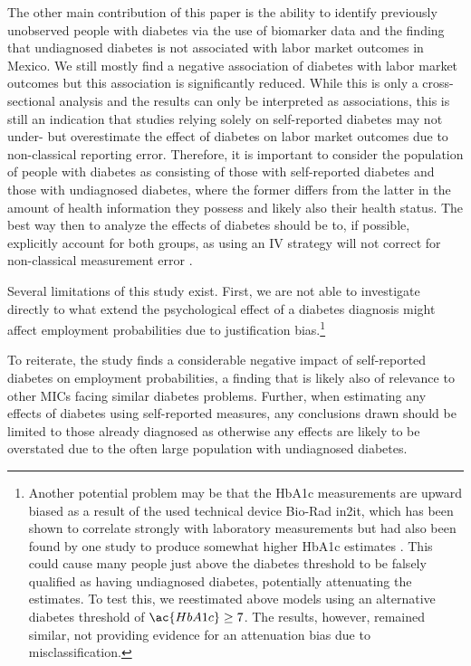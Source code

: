 \documentclass[12pt,english,british]{article}
\begin{document}
The other main contribution of this paper is the ability to identify previously unobserved people with diabetes via the use of biomarker data and the finding that undiagnosed
diabetes is not associated with labor market outcomes in Mexico. We still mostly find a negative association of diabetes with labor market outcomes but this association is significantly reduced. While this is only a cross-sectional analysis and the results can only be interpreted as associations, this is still an indication that studies relying solely on self-reported diabetes may not under- but overestimate the effect of diabetes on labor market outcomes due to non-classical reporting error. Therefore, it is important to consider the population of people with diabetes as consisting of those with self-reported diabetes and those with undiagnosed diabetes, where the former differs from the latter in the amount of health information they possess and likely also their health status. The best way then to analyze the effects of diabetes should be to, if possible, explicitly account for both groups, as using an \ac{IV} strategy will not correct for non-classical measurement error \citep{Cawley2015}.

Several limitations of this study exist. First, we are not able to investigate directly to what extend the psychological effect of a diabetes diagnosis might affect employment probabilities due to justification bias.\footnote{Another potential problem may be that the \ac{HbA1c} measurements are upward biased as a result of the used technical device Bio-Rad in2it, which has been shown to correlate strongly with laboratory measurements \citep{HealthQualityOntario2014} but had also been found by one study to produce somewhat higher \ac{HbA1c} estimates \citep{Yeo2009}. This could cause many people just above the diabetes threshold to be falsely qualified as having undiagnosed diabetes, potentially attenuating the estimates. To test this, we reestimated above models using an alternative diabetes threshold of $\ac{HbA1c} \geq 7$. The results, however, remained similar, not providing evidence for an attenuation bias due to misclassification.}

To reiterate, the study finds a considerable negative impact of self-reported diabetes on employment probabilities, a finding that is likely also of relevance to other \ac{MICs} facing similar diabetes problems. Further, when estimating any effects of diabetes using self-reported measures, any conclusions drawn should be limited to those already diagnosed as otherwise any effects are likely to be overstated due to the often large population with undiagnosed diabetes. 
\end{document}
